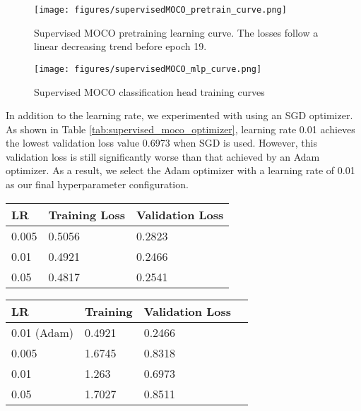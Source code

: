 \documentclass[12pt,twoside]{report}
\begin{document}
\begin{figure}
    \centering
    \texttt{[image: figures/supervisedMOCO\_pretrain\_curve.png]}
    \caption{Supervised MOCO pretraining learning curve. The losses follow a linear decreasing trend before epoch 19.}
    \label{fig:supervisedMOCO_pretrain_curve}
\end{figure}

\begin{figure}
    \centering
    \texttt{[image: figures/supervisedMOCO\_mlp\_curve.png]}
    \caption{Supervised MOCO classification head training curves}
    \label{fig:supervisedMOCO_mlp_curve}
\end{figure}


In addition to the learning rate, we experimented with using an SGD optimizer. As shown in Table \ref{tab:supervised_moco_optimizer}, learning rate 0.01 achieves the lowest validation loss value 0.6973 when SGD is used. However, this validation loss is still significantly worse than that achieved by an Adam optimizer. As a result, we select the Adam optimizer with a learning rate of 0.01 as our final hyperparameter configuration. \\

\begin{minipage}[c]{0.49\textwidth}
    \centering
    \begin{tabular}{lll}
    \toprule
    LR & Training Loss & Validation Loss \\
    \midrule
    0.005 & 0.5056 & 0.2823 \\
    0.01 & 0.4921 & 0.2466 \\
    0.05 & 0.4817 & 0.2541 \\
    \bottomrule
    \end{tabular}
    \captionsetup{type=table}
    \label{tab:supervised_moco_lr}
\end{minipage}
\begin{minipage}[c]{0.5\textwidth}
    \centering
    \begin{tabular}{llll}
    \toprule
    LR & Training & Validation Loss \\
    \midrule
    0.01 (Adam) & 0.4921 & 0.2466 \\
    \midrule
    0.005 & 1.6745 & 0.8318 \\
    0.01  & 1.263 & 0.6973 \\
    0.05  & 1.7027 & 0.8511 \\
    \bottomrule
    \end{tabular}
    \captionsetup{type=table}
    \label{tab:supervised_moco_optimizer}
\end{minipage}
\end{document}

